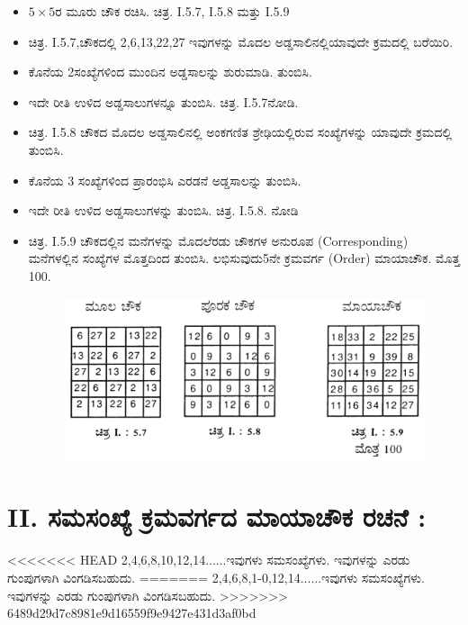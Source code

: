\begin{itemize}
	\item $5 \times 5$ರ ಮೂರು ಚೌಕ ರಚಿಸಿ. ಚಿತ್ರ. I.5.7, I.5.8 ಮತ್ತು I.5.9
	\item ಚಿತ್ರ. I.5.7,ಚೌಕದಲ್ಲಿ 2,6,13,22,27 ಇವುಗಳನ್ನು ಮೊದಲ ಅಡ್ಡಸಾಲಿನಲ್ಲಿ\break ಯಾವುದೇ ಕ್ರಮದಲ್ಲಿ ಬರೆಯಿರಿ.
	\item ಕೊನೆಯ 2ಸಂಖ್ಯೆಗಳಿಂದ ಮುಂದಿನ ಅಡ್ಡಸಾಲನ್ನು ಶುರುಮಾಡಿ. ತುಂಬಿಸಿ.
	\item ಇದೇ ರೀತಿ ಉಳಿದ ಅಡ್ಡಸಾಲುಗಳನ್ನೂ ತುಂಬಿಸಿ. ಚಿತ್ರ. I.5.7ನೋಡಿ.
	\item ಚಿತ್ರ. I.5.8 ಚೌಕದ ಮೊದಲ ಅಡ್ಡಸಾಲಿನಲ್ಲಿ ಅಂಕಗಣಿತ ಶ್ರೇಢಿಯಲ್ಲಿರುವ ಸಂಖ್ಯೆಗಳನ್ನು ಯಾವುದೇ ಕ್ರಮದಲ್ಲಿ ತುಂಬಿಸಿ.
	\item ಕೊನೆಯ 3 ಸಂಖ್ಯೆಗಳಿಂದ ಪ್ರಾರಂಭಿಸಿ ಎರಡನೆ ಅಡ್ಡಸಾಲನ್ನು ತುಂಬಿಸಿ.
	\item ಇದೇ ರೀತಿ ಉಳಿದ ಅಡ್ಡಸಾಲುಗಳನ್ನು ತುಂಬಿಸಿ. ಚಿತ್ರ. I.5.8. ನೋಡಿ
\newpage
	\item ಚಿತ್ರ. I.5.9 ಚೌಕದಲ್ಲಿನ ಮನೆಗಳನ್ನು ಮೊದಲೆರಡು ಚೌಕಗಳ ಅನುರೂಪ (Corresponding) ಮನೆಗಳಲ್ಲಿನ ಸಂಖ್ಯೆಗಳ ಮೊತ್ತದಿಂದ ತುಂಬಿಸಿ. ಲಭಿಸುವುದು\break 5ನೇ ಕ್ರಮವರ್ಗ (Order) ಮಾಯಾಚೌಕ. ಮೊತ್ತ 100.

	\begin{figure}[h]
	\includegraphics{src/figures/chap3/fig3-13.jpg}
	\end{figure}
\end{itemize}

\section*{II. ಸಮಸಂಖ್ಯೆ ಕ್ರಮವರ್ಗದ ಮಾಯಾಚೌಕ ರಚನೆ :}

<<<<<<< HEAD
2,4,6,8,10,12,14......ಇವುಗಳು ಸಮಸಂಖ್ಯೆಗಳು. ಇವುಗಳನ್ನು ಎರಡು ಗುಂಪುಗಳಾಗಿ ವಿಂಗಡಿಸಬಹುದು.
=======
2,4,6,8,1-0,12,14......ಇವುಗಳು ಸಮಸಂಖ್ಯೆಗಳು. ಇವುಗಳನ್ನು ಎರಡು ಗುಂಪು\-ಗಳಾಗಿ ವಿಂಗಡಿಸಬಹುದು.
>>>>>>> 6489d29d7c8981e9d16559f9e9427e431d3af0bd

